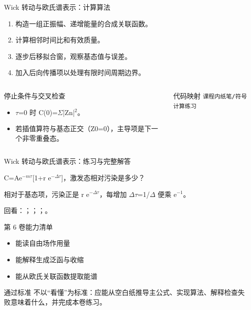 \begin{frame}[t]{Wick 转动与欧氏谱表示：计算算法}
\footnotesize
{}\begin{enumerate}
\item 构造一组正振幅、递增能量的合成关联函数。
\item 计算相邻时间比和有效质量。
\item 逐步后移拟合窗，观察基态值与误差。
\item 加入后向传播项以处理有限时间周期边界。
\end{enumerate}\begin{columns}[T,onlytextwidth]
\begin{block}{停止条件与交叉检查}\scriptsize\begin{itemize}
\item[\CheckMark] \ensuremath{\tau}=0 时 C(0)=\ensuremath{\Sigma}|Zn|\ensuremath{^{2}}。
\item[\CheckMark] 若插值算符与基态正交（Z0=0），主导项是下一个非零重叠态。
\end{itemize}\end{block}
\begin{block}{代码映射}
\scriptsize \texttt{课程内纸笔/\allowbreak{}符号计算练习}
\end{block}\end{columns}\end{frame}

\begin{frame}[t]{Wick 转动与欧氏谱表示：练习与完整解答}
\footnotesize
\begin{block}{}C=Ae\ensuremath{^{-m\tau}}[1+r e\ensuremath{^{-\Delta\tau}}]，激发态相对污染是多少？\end{block}
\begin{exampleblock}{}相对于基态项，污染正是 r e\ensuremath{^{-\Delta\tau}}，每增加 \ensuremath{\Delta}\ensuremath{\tau}=1/\allowbreak{}\ensuremath{\Delta} 便乘 e\ensuremath{^{-1}}。\end{exampleblock}
\vfill
\scriptsize 回看：；；；。
\end{frame}

\begin{frame}[t]{第 6 卷能力清单}
\small\begin{itemize}
\item[\CheckMark] 能读自由场作用量
\item[\CheckMark] 能解释生成泛函与收缩
\item[\CheckMark] 能从欧氏关联函数提取能谱
\end{itemize}\vfill\begin{block}{通过标准}
不以“看懂”为标准：应能从空白纸推导主公式、实现算法、解释检查失败意味着什么，并完成本卷练习。
\end{block}\end{frame}


